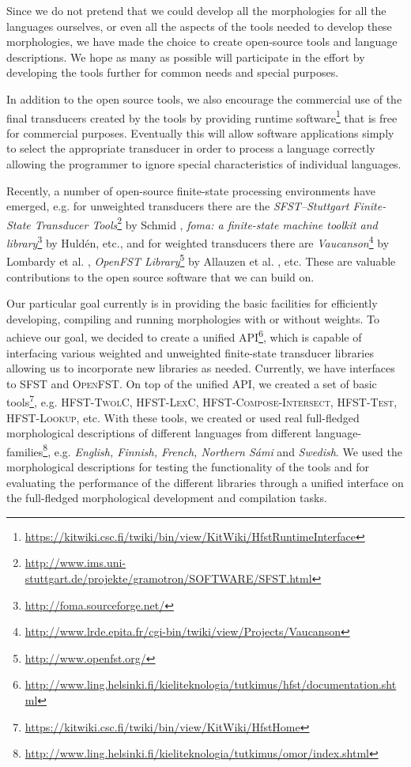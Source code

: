 \documentclass[postprint]{flammie}
\begin{document}
Since we do not pretend that we could develop all the morphologies for
all the languages ourselves, or even all the aspects of the tools
needed to develop these morphologies, we have made the choice to
create open-source tools and language descriptions. We hope as many as
possible will participate in the effort by developing the tools
further for common needs and special purposes.

In addition to the open source tools, we also encourage the commercial
use of the final transducers created by the tools by providing runtime
software\footnote{\url{https://kitwiki.csc.fi/twiki/bin/view/KitWiki/HfstRuntimeInterface}}
that is free for commercial purposes. Eventually this will allow
software applications simply to select the appropriate transducer in
order to process a language correctly allowing the programmer to
ignore special characteristics of individual languages.

Recently, a number of open-source finite-state processing environments
have emerged, e.g.  for unweighted transducers there are the
\emph{SFST--Stuttgart Finite-State Transducer
Tools}\footnote{\url{http://www.ims.uni-stuttgart.de/projekte/gramotron/SOFTWARE/SFST.html}}
by Schmid \cite{sfst}, \emph{foma: a finite-state machine toolkit and
library}\footnote{\url{http://foma.sourceforge.net/}} by Huld\'en,
etc., and for weighted transducers there are
\emph{Vaucanson}\footnote{\url{http://www.lrde.epita.fr/cgi-bin/twiki/view/Projects/Vaucanson}}
by Lombardy et al. \cite{vaucanson}, \emph{OpenFST
Library}\footnote{\url{http://www.openfst.org/}} by Allauzen et
al. \cite{openfst}, etc. These are valuable contributions to the open
source software that we can build on.

Our particular goal currently is in providing the basic facilities for
efficiently developing, compiling and running morphologies with or
without weights. To achieve our goal, we decided to create a unified
API\footnote{\url{http://www.ling.helsinki.fi/kieliteknologia/tutkimus/hfst/documentation.shtml}},
which is capable of interfacing various weighted and unweighted
finite-state transducer libraries allowing us to incorporate new
libraries as needed.  Currently, we have interfaces to \textsc{SFST}
and \textsc{OpenFST}. On top of the unified API, we created a set of
basic
tools\footnote{\url{https://kitwiki.csc.fi/twiki/bin/view/KitWiki/HfstHome}},
e.g. \textsc{HFST-TwolC, HFST-LexC, HFST-Compose-Inter\-sect,
HFST-Test, HFST-Lookup}, etc. With these tools, we created or used
real full-fledged morphological descriptions of different languages
from different
language-families\footnote{\url{http://www.ling.helsinki.fi/kieliteknologia/tutkimus/omor/index.shtml}},
e.g.  \emph{English, Finnish, French, Northern S\'ami} and
\emph{Swedish}. We used the morphological descriptions for testing the
functionality of the tools and for evaluating the performance of the
different libraries through a unified interface on the full-fledged
morphological development and compilation tasks.
\end{document}
